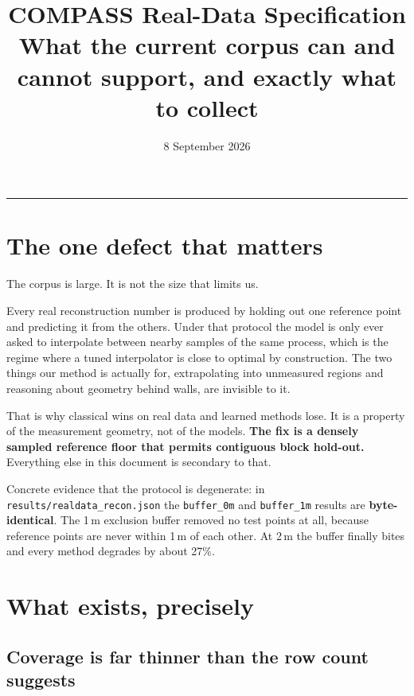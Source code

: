 \documentclass[10pt,a4paper]{article}
\title{\vspace{-1.4cm}\textbf{COMPASS Real-Data Specification}\\[1.5mm]
\large What the current corpus can and cannot support, and exactly what to collect}
\date{8 September 2026}\author{}
\newcommand{\B}[1]{\textcolor{bad}{\textbf{#1}}}
\begin{document}
\maketitle\vspace{-9mm}\hrule\vspace{3mm}

\section{The one defect that matters}

The corpus is large. It is not the size that limits us.

Every real reconstruction number is produced by holding out one reference point and
predicting it from the others. Under that protocol the model is only ever asked to
interpolate between nearby samples of the same process, which is the regime where a
tuned interpolator is close to optimal by construction. The two things our method is
actually for, extrapolating into unmeasured regions and reasoning about geometry behind
walls, are invisible to it.

That is why classical wins on real data and learned methods lose. It is a property of
the measurement geometry, not of the models. \textbf{The fix is a densely sampled
reference floor that permits contiguous block hold-out.} Everything else in this document
is secondary to that.

Concrete evidence that the protocol is degenerate: in
\texttt{results/realdata\_recon.json} the \texttt{buffer\_0m} and \texttt{buffer\_1m}
results are \B{byte-identical}. The 1\,m exclusion buffer removed no test points at all,
because reference points are never within 1\,m of each other. At 2\,m the buffer finally
bites and every method degrades by about 27\%.

\section{What exists, precisely}

\subsection{Coverage is far thinner than the row count suggests}
\end{document}

